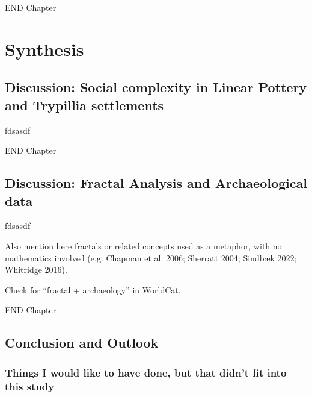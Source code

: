 \documentclass[
  12pt,
]{book}
\begin{document}
END Chapter

\hypertarget{part-synthesis}{%
\part{Synthesis}\label{part-synthesis}}

\hypertarget{disc-results}{%
\chapter{Discussion: Social complexity in Linear Pottery and Trypillia settlements}\label{disc-results}}

fdsasdf

END Chapter

\hypertarget{disc-methods}{%
\chapter{Discussion: Fractal Analysis and Archaeological data}\label{disc-methods}}

fdsasdf

Also mention here fractals or related concepts used as a metaphor, with no mathematics involved (e.g. Chapman et al. 2006; Sherratt 2004; Sindbæk 2022; Whitridge 2016).

Check for ``fractal + archaeology'' in WorldCat.

END Chapter

\hypertarget{conclusion}{%
\chapter{Conclusion and Outlook}\label{conclusion}}

\hypertarget{things-i-would-like-to-have-done-but-that-didnt-fit-into-this-study}{%
\section{Things I would like to have done, but that didn't fit into this study}\label{things-i-would-like-to-have-done-but-that-didnt-fit-into-this-study}}
\end{document}
